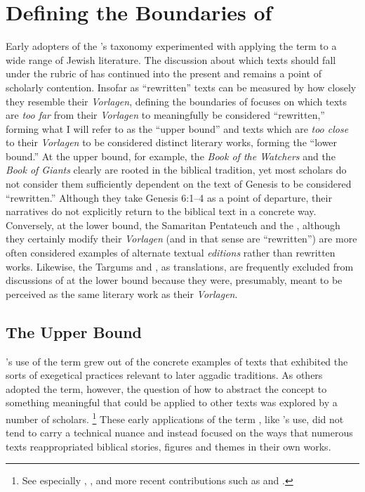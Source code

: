 \section{Defining the Boundaries of \RWB}

Early adopters of the \vermes's taxonomy experimented with applying the term \rwb to a wide range of \secondtemple Jewish literature. The discussion about which texts should fall under the rubric of \rwb has continued into the present and remains a point of scholarly contention. Insofar as ``rewritten'' texts can be measured by how closely they resemble their \emph{Vorlagen}, defining the boundaries of \rwb focuses on which texts are \emph{too far} from their \emph{Vorlagen} to meaningfully be considered ``rewritten,'' forming what I will refer to as the ``upper bound'' and texts which are \emph{too close} to their \emph{Vorlagen} to be considered distinct literary works, forming the ``lower bound.'' At the upper bound, for example, the \emph{Book of the Watchers} and the \emph{Book of Giants} clearly are rooted in the biblical tradition, yet most scholars do not consider them sufficiently dependent on the text of Genesis to be considered ``rewritten.'' Although they take Genesis 6:1--4 as a point of departure, their narratives do not explicitly return to the biblical text in a concrete way. Conversely, at the lower bound, the Samaritan Pentateuch and the , although they certainly modify their \emph{Vorlagen} (and in that sense are ``rewritten'') are more often considered examples of alternate textual \emph{editions} rather than rewritten works. Likewise, the Targums and \lxx, as translations, are frequently excluded from discussions of \rwb at the lower bound because they were, presumably, meant to be perceived as the same literary work as their \emph{Vorlagen}. 


\subsection{The Upper Bound}

\vermes's use of the term \rwb grew out of the concrete examples of texts that exhibited the sorts of exegetical practices relevant to later aggadic traditions. As others adopted the term, however, the question of how to abstract the concept to something meaningful that could be applied to other texts was explored by a number of scholars.%
    \footnote{See especially
        \cite{nickelsburg_stone1984},
        \cite{harrington_kraft-nickelsburg1986}, 
        and more recent contributions such as 
        \cite{crawford2008} and 
        \cite{falk2007}.}
These early applications of the term \rwb, like \vermes's use, did not tend to carry a technical nuance and instead focused on the ways that numerous texts reappropriated biblical stories, figures and themes in their own works. 

